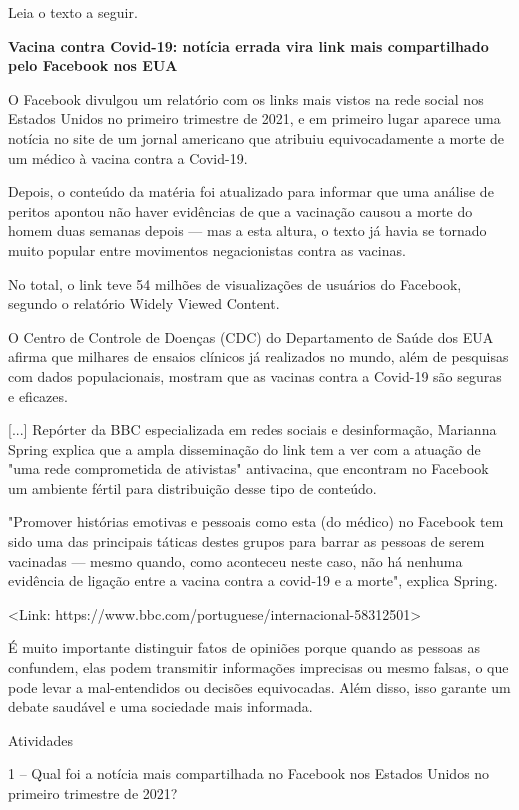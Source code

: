 Leia o texto a seguir.

\textbf{Vacina contra Covid-19: notícia errada vira link mais
compartilhado pelo Facebook nos EUA}

O Facebook divulgou um relatório com os links mais vistos na rede social
nos Estados Unidos no primeiro trimestre de 2021, e em primeiro lugar
aparece uma notícia no site de um jornal americano que atribuiu
equivocadamente a morte de um médico à vacina contra a Covid-19.

Depois, o conteúdo da matéria foi atualizado para informar que uma
análise de peritos apontou não haver evidências de que a vacinação
causou a morte do homem duas semanas depois --- mas a esta altura, o
texto já havia se tornado muito popular entre movimentos negacionistas
contra as vacinas.

No total, o link teve 54 milhões de visualizações de usuários do
Facebook, segundo o relatório Widely Viewed Content.

O Centro de Controle de Doenças (CDC) do Departamento de Saúde dos EUA
afirma que milhares de ensaios clínicos já realizados no mundo, além de
pesquisas com dados populacionais, mostram que as vacinas contra a
Covid-19 são seguras e eficazes.

{[}...{]} Repórter da BBC especializada em redes sociais e
desinformação, Marianna Spring explica que a ampla disseminação do link
tem a ver com a atuação de "uma rede comprometida de ativistas"
antivacina, que encontram no Facebook um ambiente fértil para
distribuição desse tipo de conteúdo.

"Promover histórias emotivas e pessoais como esta (do médico) no
Facebook tem sido uma das principais táticas destes grupos para barrar
as pessoas de serem vacinadas --- mesmo quando, como aconteceu neste
caso, não há nenhuma evidência de ligação entre a vacina contra a
covid-19 e a morte", explica Spring.

\textless{}Link:
https://www.bbc.com/portuguese/internacional-58312501\textgreater{}

É muito importante distinguir fatos de opiniões porque quando as pessoas
as confundem, elas podem transmitir informações imprecisas ou mesmo
falsas, o que pode levar a mal-entendidos ou decisões equivocadas. Além
disso, isso garante um debate saudável e uma sociedade mais informada.

Atividades

1 -- Qual foi a notícia mais compartilhada no Facebook nos Estados
Unidos no primeiro trimestre de 2021?


